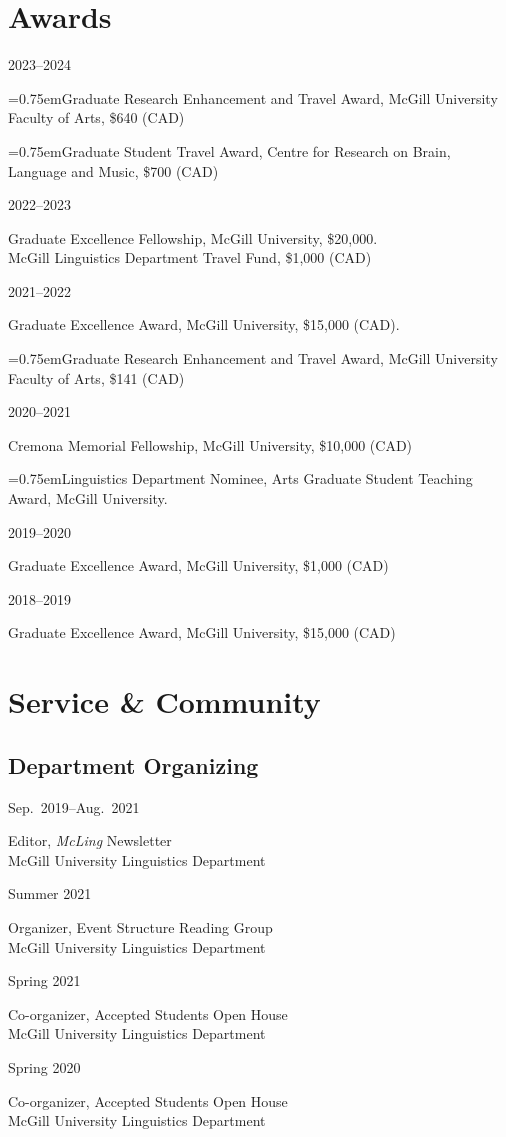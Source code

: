 \documentclass[11pt,oneside,DIV=calc,parskip=off]{scrarticle} %
\newlength{\leftcolwidth}
\newlength{\rightcolwidth}
\newlength{\spacingbefore}
\newlength{\spacingafter}
\newcommand{\hang}{\hangindent=0.75em\hangafter=1}
\newcommand{\mytwocol}[2]{%
	\vspace{\spacingbefore}%
	\begin{minipage}[t]{\leftcolwidth}%
		\strut#1%
	\end{minipage}%
	\begin{minipage}[t]{\rightcolwidth}%
		\strut#2%
	\end{minipage}%
	\vspace{\spacingafter}\par%
	}
\newcommand{\cvline}[2]{%
	\mytwocol{#1}{#2}%
	}
\begin{document}
\section{Awards}

\cvline{2023--2024}{\hang Graduate Research Enhancement and Travel Award, McGill University Faculty of Arts, \$640 (CAD)\par \hang Graduate Student Travel Award, Centre for Research on Brain, Language and Music, \$700 (CAD)}
\cvline{2022--2023}{Graduate Excellence Fellowship, McGill University, \$20,000.\\McGill Linguistics Department Travel Fund, \$1,000 (CAD)}
\cvline{2021--2022}{Graduate Excellence Award, McGill University, \$15,000 (CAD).\par \hang Graduate Research Enhancement and Travel Award, McGill University Faculty of Arts, \$141 (CAD)}
\cvline{2020--2021}{Cremona Memorial Fellowship, McGill University, \$10,000 (CAD)\par \hang Linguistics Department Nominee, Arts Graduate Student Teaching Award, McGill University.}
\cvline{2019--2020}{Graduate Excellence Award, McGill University, \$1,000 (CAD)}
\cvline{2018--2019}{Graduate Excellence Award, McGill University, \$15,000 (CAD)}


\section{Service \& Community}

\subsection{Department Organizing}
\cvline{Sep.\ 2019--Aug.\ 2021}{Editor, \textit{McLing} Newsletter\\McGill University Linguistics Department}
\cvline{Summer 2021}{Organizer, Event Structure Reading Group\\McGill University Linguistics Department}
\cvline{Spring 2021}{Co-organizer, Accepted Students Open House\\McGill University Linguistics Department}
\cvline{Spring 2020}{Co-organizer, Accepted Students Open House\\McGill University Linguistics Department}
\end{document}
